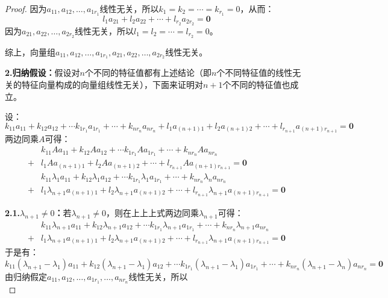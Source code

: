 \begin{proof}
	因为$a_{11},a_{12},\dots,a_{1r_1}$线性无关，所以$k_1=k_2=\cdots=k_{r_1}=0$，从而：
	\begin{equation*}
		l_1a_{21}+l_2a_{22}+\cdots+l_{r_2}a_{2r_2}=\mathbf{0}
	\end{equation*}
	因为$a_{21},a_{22},\dots,a_{2r_2}$线性无关，所以$l_1=l_2=\cdots=l_{r_2}=0$。\par
	综上，向量组$a_{11},a_{12},\dots,a_{1r_1},a_{21},a_{22},\dots,a_{2r_2}$线性无关。\par
	\textbf{2.归纳假设：}假设对$n$个不同的特征值都有上述结论（即$n$个不同特征值的线性无关的特征向量构成的向量组线性无关），下面来证明对$n+1$个不同的特征值也成立。\par
	设：
	\begin{equation*}
		k_{11}a_{11}+k_{12}a_{12}+\cdots k_{1r_1}a_{1r_1}+\cdots+k_{nr_n}a_{nr_n}+l_1a_{(n+1)1}+l_2a_{(n+1)2}+\cdots+l_{r_{n+1}}a_{(n+1)r_{n+1}}=\mathbf{0}
	\end{equation*}
	两边同乘$A$可得：
	\begin{align*}
		&k_{11}Aa_{11}+k_{12}Aa_{12}+\cdots k_{1r_1}Aa_{1r_1}+\cdots+k_{nr_n}Aa_{nr_n} \\
		+&l_1Aa_{(n+1)1}+l_2Aa_{(n+1)2}+\cdots+l_{r_{n+1}}Aa_{(n+1)r_{n+1}}=\mathbf{0} \\
		&k_{11}\lambda_1a_{11}+k_{12}\lambda_1a_{12}+\cdots k_{1r_1}\lambda_1a_{1r_1}+\cdots+k_{nr_n}\lambda_na_{nr_n} \\
		+&l_1\lambda_{n+1}a_{(n+1)1}+l_2\lambda_{n+1}a_{(n+1)2}+\cdots+l_{r_{n+1}}\lambda_{n+1}a_{(n+1)r_{n+1}}=\mathbf{0}
	\end{align*}\par
	\textbf{2.1.$\lambda_{n+1}\ne0$：}若$\lambda_{n+1}\ne0$，则在上上上式两边同乘$\lambda_{n+1}$可得：
	\begin{align*}
		&k_{11}\lambda_{n+1}a_{11}+k_{12}\lambda_{n+1}a_{12}+\cdots k_{1r_1}\lambda_{n+1}a_{1r_1}+\cdots+k_{nr_n}\lambda_{n+1}a_{nr_n} \\
		+&l_1\lambda_{n+1}a_{(n+1)1}+l_2\lambda_{n+1}a_{(n+1)2}+\cdots+l_{r_{n+1}}\lambda_{n+1}a_{(n+1)r_{n+1}}=\mathbf{0}
	\end{align*}
	于是有：
	\begin{equation*}
		k_{11}(\lambda_{n+1}-\lambda_1)a_{11}+k_{12}(\lambda_{n+1}-\lambda_1)a_{12}+\cdots k_{1r_1}(\lambda_{n+1}-\lambda_1)a_{1r_1}+\cdots+k_{nr_n}(\lambda_{n+1}-\lambda_n)a_{nr_n}=\mathbf{0}
	\end{equation*}
	由归纳假定$a_{11},a_{12},\dots,a_{1r_1},\dots,a_{nr_n}$线性无关，所以
	\begin{equation*}

\end{equation*}
\end{proof}
